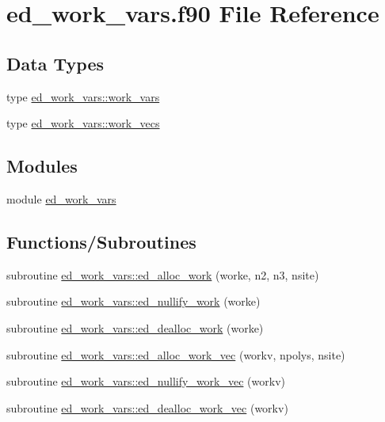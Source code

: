 \hypertarget{ed__work__vars_8f90}{}\section{ed\+\_\+work\+\_\+vars.\+f90 File Reference}
\label{ed__work__vars_8f90}
\subsection*{Data Types}
\begin{DoxyCompactItemize}
\item 
type \hyperlink{structed__work__vars_1_1work__vars}{ed\+\_\+work\+\_\+vars\+::work\+\_\+vars}
\item 
type \hyperlink{structed__work__vars_1_1work__vecs}{ed\+\_\+work\+\_\+vars\+::work\+\_\+vecs}
\end{DoxyCompactItemize}
\subsection*{Modules}
\begin{DoxyCompactItemize}
\item 
module \hyperlink{namespaceed__work__vars}{ed\+\_\+work\+\_\+vars}
\end{DoxyCompactItemize}
\subsection*{Functions/\+Subroutines}
\begin{DoxyCompactItemize}
\item 
subroutine \hyperlink{namespaceed__work__vars_a01ba1ac60fb7fc6120b2caa0044b3c21}{ed\+\_\+work\+\_\+vars\+::ed\+\_\+alloc\+\_\+work} (worke, n2, n3, nsite)
\item 
subroutine \hyperlink{namespaceed__work__vars_aa1df64125c17b7fc7f50eda82c32e805}{ed\+\_\+work\+\_\+vars\+::ed\+\_\+nullify\+\_\+work} (worke)
\item 
subroutine \hyperlink{namespaceed__work__vars_afa61eb802d72e14002f44379afceea9d}{ed\+\_\+work\+\_\+vars\+::ed\+\_\+dealloc\+\_\+work} (worke)
\item 
subroutine \hyperlink{namespaceed__work__vars_a5df6efe6c5b192d365161ad999858f25}{ed\+\_\+work\+\_\+vars\+::ed\+\_\+alloc\+\_\+work\+\_\+vec} (workv, npolys, nsite)
\item 
subroutine \hyperlink{namespaceed__work__vars_a328d5a0e766e58bd6e2b015fa91ad8db}{ed\+\_\+work\+\_\+vars\+::ed\+\_\+nullify\+\_\+work\+\_\+vec} (workv)
\item 
subroutine \hyperlink{namespaceed__work__vars_a61bfa6695e1a8ac94e02b917a83aabea}{ed\+\_\+work\+\_\+vars\+::ed\+\_\+dealloc\+\_\+work\+\_\+vec} (workv)
\end{DoxyCompactItemize}
